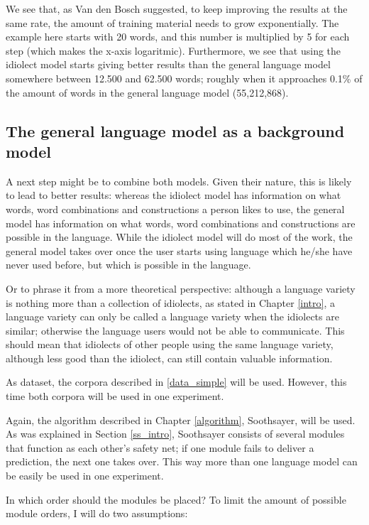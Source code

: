 \documentclass[11pt]{article}
\begin{document}
We see that, as Van den Bosch  suggested, to keep improving the results at the same rate, the amount of training material needs to grow exponentially. The example here starts with 20 words, and this number is multiplied by 5 for each step (which makes the x-axis logaritmic). Furthermore, we see that using the idiolect model starts giving better results  than the general language model somewhere between 12.500 and 62.500 words; roughly when it approaches 0.1\% of the amount of words in the general language model (55,212,868).

\subsection{The general language model as a background model} \label{background}

A next step might be to combine both models. Given their nature, this is likely to lead to better results: whereas the idiolect model has information on what words, word combinations and constructions a person likes to use, the general model has information on what words, word combinations and constructions are possible in the language. While the idiolect model will do most of the work, the general model takes over once the user starts using language which he/she have never used before, but which is possible in the language. 

Or to phrase it from a more theoretical perspective: although a language variety is nothing more than a collection of idiolects, as stated in Chapter \ref{intro}, a language variety can only be called a language variety when the idiolects are similar; otherwise the language users would not be able to communicate. This should mean that idiolects of other people using the same language variety, although less good than the idiolect, can still contain valuable information.


As dataset, the corpora described in \ref{data_simple} will be used. However, this time  both corpora will be used in one experiment.

Again, the algorithm described in Chapter \ref{algorithm}, Soothsayer, will be used. As was explained in Section \ref{ss_intro}, Soothsayer consists of several modules that function as each other's safety net; if one module fails to deliver a prediction, the next one takes over. This way more than one language model can be easily be used in one experiment.

In which order should the modules be placed? To limit the amount of possible module orders, I will do two assumptions:
\end{document}
